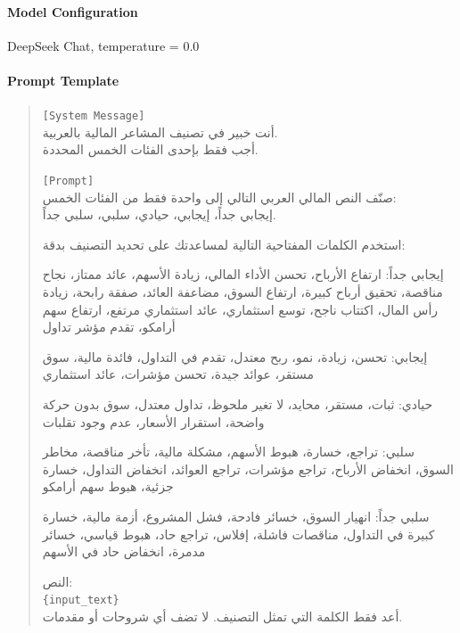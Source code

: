 \documentclass[10pt,a4paper]{article}
\begin{document}
\paragraph{Model Configuration}
DeepSeek Chat, temperature = 0.0

\paragraph{Prompt Template}

\begin{quote}
\small
\texttt{[System Message]}\\
\textarabic{أنت خبير في تصنيف المشاعر المالية بالعربية.}\\
\textarabic{أجب فقط بإحدى الفئات الخمس المحددة.}

\vspace{0.5em}
\texttt{[Prompt]}\\
\textarabic{صنّف النص المالي العربي التالي إلى واحدة فقط من الفئات الخمس:}\\
\textarabic{إيجابي جداً، إيجابي، حيادي، سلبي، سلبي جداً.}

\vspace{0.5em}
\textarabic{استخدم الكلمات المفتاحية التالية لمساعدتك على تحديد التصنيف بدقة:}

\vspace{0.5em}
\textarabic{إيجابي جداً: ارتفاع الأرباح، تحسن الأداء المالي، زيادة الأسهم، عائد ممتاز، نجاح مناقصة، تحقيق أرباح كبيرة، ارتفاع السوق، مضاعفة العائد، صفقة رابحة، زيادة رأس المال، اكتتاب ناجح، توسع استثماري، عائد استثماري مرتفع، ارتفاع سهم أرامكو، تقدم مؤشر تداول}

\vspace{0.5em}
\textarabic{إيجابي: تحسن، زيادة، نمو، ربح معتدل، تقدم في التداول، فائدة مالية، سوق مستقر، عوائد جيدة، تحسن مؤشرات، عائد استثماري}

\vspace{0.5em}
\textarabic{حيادي: ثبات، مستقر، محايد، لا تغير ملحوظ، تداول معتدل، سوق بدون حركة واضحة، استقرار الأسعار، عدم وجود تقلبات}

\vspace{0.5em}
\textarabic{سلبي: تراجع، خسارة، هبوط الأسهم، مشكلة مالية، تأخر مناقصة، مخاطر السوق، انخفاض الأرباح، تراجع مؤشرات، تراجع العوائد، انخفاض التداول، خسارة جزئية، هبوط سهم أرامكو}

\vspace{0.5em}
\textarabic{سلبي جداً: انهيار السوق، خسائر فادحة، فشل المشروع، أزمة مالية، خسارة كبيرة في التداول، مناقصات فاشلة، إفلاس، تراجع حاد، هبوط قياسي، خسائر مدمرة، انخفاض حاد في الأسهم}

\vspace{0.5em}
\textarabic{النص:}\\
\texttt{\{input\_text\}}\\
\textarabic{أعد فقط الكلمة التي تمثل التصنيف. لا تضف أي شروحات أو مقدمات.}
\end{quote}
\end{document}
